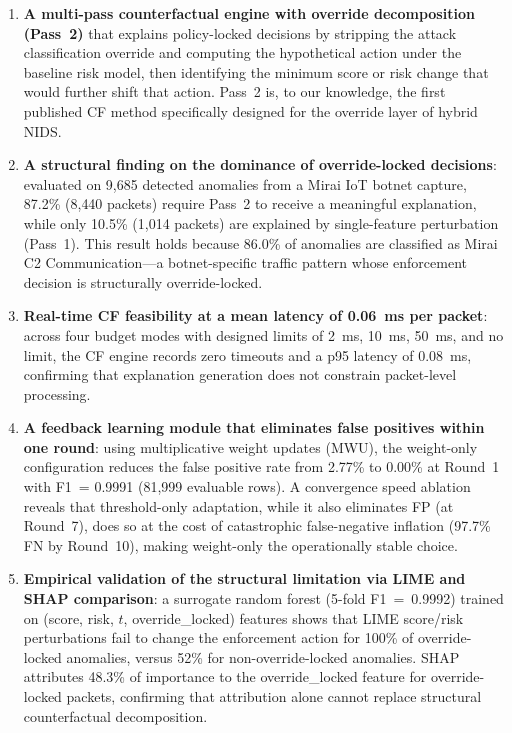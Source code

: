 \documentclass[preprint,12pt,authoryear]{elsarticle}
\begin{document}
\begin{enumerate}
\item \textbf{A multi-pass counterfactual engine with override decomposition
  (Pass~2)} that explains policy-locked decisions by stripping the attack
  classification override and computing the hypothetical action under the
  baseline risk model, then identifying the minimum score or risk change that
  would further shift that action. Pass~2 is, to our knowledge, the first
  published CF method specifically designed for the override layer of hybrid
  NIDS.

\item \textbf{A structural finding on the dominance of override-locked
  decisions}: evaluated on 9{,}685 detected anomalies from a Mirai IoT botnet
  capture, 87.2\% (8{,}440 packets) require Pass~2 to receive a meaningful
  explanation, while only 10.5\% (1{,}014 packets) are explained by
  single-feature perturbation (Pass~1). This result holds because 86.0\% of
  anomalies are classified as Mirai C2 Communication---a botnet-specific
  traffic pattern whose enforcement decision is structurally override-locked.

\item \textbf{Real-time CF feasibility at a mean latency of \SI{0.06}{\ms}
  per packet}: across four budget modes with designed limits of \SI{2}{\ms},
  \SI{10}{\ms}, \SI{50}{\ms}, and no limit, the CF engine records zero timeouts
  and a p95 latency of \SI{0.08}{\ms}, confirming that explanation generation
  does not constrain packet-level processing.

\item \textbf{A feedback learning module that eliminates false positives within
  one round}: using multiplicative weight updates (MWU), the weight-only
  configuration reduces the false positive rate from 2.77\% to 0.00\% at
  Round~1 with F1~= 0.9991 (81{,}999 evaluable rows). A convergence speed
  ablation reveals that threshold-only adaptation, while it also eliminates
  FP (at Round~7), does so at the cost of catastrophic false-negative inflation
  (97.7\% FN by Round~10), making weight-only the operationally stable choice.

\item \textbf{Empirical validation of the structural limitation via LIME and
  SHAP comparison}: a surrogate random forest (5-fold F1~=~0.9992) trained on
  (score, risk, $t$, override\_locked) features shows that LIME score/risk
  perturbations fail to change the enforcement action for 100\% of
  override-locked anomalies, versus 52\% for non-override-locked anomalies.
  SHAP attributes 48.3\% of importance to the override\_locked feature for
  override-locked packets, confirming that attribution alone cannot replace
  structural counterfactual decomposition.


\end{enumerate}
\end{document}
